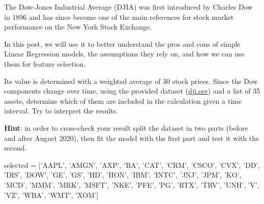 
\cprotEnv\begin{question}
The Dow-Jones Industrial Average (DJIA) was first introduced by Charles Dow in 1896 and has since become one of the main references for stock market performance on the New York Stock Exchange.

In this post, we will use it to better understand the pros and cons of simple Linear Regression models, the assumptions they rely on, and how we can use them for feature selection.

Its value is determined with a weighted average of 30 stock prices. Since the Dow components change over time, using the provided dataset (\href{"https://github.com/matteosan1/finance_course/raw/master/input_files/dji.csv}{dji.csv}) and a list of 35 assets, determine which of them are included in the calculation given a time interval. Try to interpret the results.

\textbf{Hint}: in order to cross-check your result split the dataset in two parts (before and after August 2020), then fit the model with the first part and test it with the second.
\begin{ipython}
selected = ['AAPL', 'AMGN', 'AXP', 'BA', 'CAT', 'CRM', 'CSCO', 'CVX', 'DD', 'DIS', 
            'DOW', 'GE', 'GS', 'HD', 'HON', 'IBM', 'INTC', 'JNJ', 'JPM', 'KO', 'MCD', 
            'MMM', 'MRK', 'MSFT', 'NKE', 'PFE', 'PG', 'RTX', 'TRV', 'UNH', 'V', 'VZ', 
            'WBA', 'WMT', 'XOM']
\end{ipython}
\end{question}

